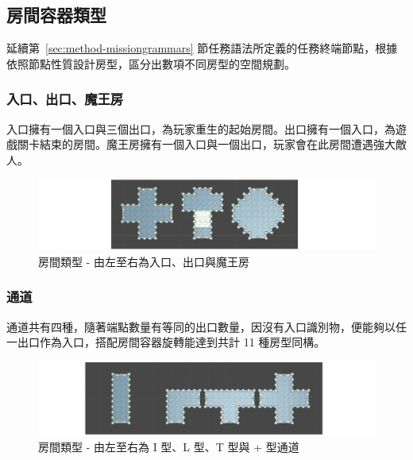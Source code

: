 \subsection{房間容器類型}
\label{ssec:method-spacepieces-types}

延續第~\ref{sec:method-missiongrammars} 節任務語法所定義的任務終端節點，根據依照節點性質設計房型，區分出數項不同房型的空間規劃。

\subsubsection{入口、出口、魔王房}
\label{sssec:method-spacepieces-types-mainpath-i}

入口擁有一個入口與三個出口，為玩家重生的起始房間。出口擁有一個入口，為遊戲關卡結束的房間。魔王房擁有一個入口與一個出口，玩家會在此房間遭遇強大敵人。

\begin{figure}[ht]
  \begin{center}
    \includegraphics[width=1.0\textwidth]{figures/roomtype-mainpath-i.png}
    \caption{房間類型 - 由左至右為入口、出口與魔王房}
    \label{fig:roomtype-mainpath-i}
  \end{center}
\end{figure}

\subsubsection{通道}
\label{sssec:method-spacepieces-types-path}

通道共有四種，隨著端點數量有等同的出口數量，因沒有入口識別物，便能夠以任一出口作為入口，搭配房間容器旋轉能達到共計 11 種房型同構。

\begin{figure}[ht]
  \begin{center}
    \includegraphics[width=1.0\textwidth]{figures/roomtype-mainpath-ii.png}
    \caption{房間類型 - 由左至右為 I 型、L 型、T 型與 + 型通道}
    \label{fig:roomtype-mainpath-ii}
  \end{center}
\end{figure}


